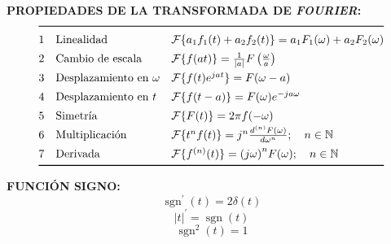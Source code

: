 \documentclass[letter,twoside,8pt]{article}
\DeclareMathOperator{\sgn}{sgn}
\begin{document}
\textbf{PROPIEDADES DE LA TRANSFORMADA DE \emph{FOURIER}:}
\begin{equation*}
\def\arraystretch{1.4}
\begin{array}{@{}cll@{}}
\toprule
 1 & \text{Linealidad}
   & \mathcal{F}\{a_1f_1(t)+a_2f_2(t)\}=a_1F_1(\omega)+a_2F_2(\omega)\\
 2 & \text{Cambio de escala}
   & \mathcal{F}\{f(at)\}=\frac{1}{|a|}F\left(\frac{\omega}{a}\right)\\
 3 & \text{Desplazamiento en }\omega
   & \mathcal{F}\{f(t)e^{jat}\}=F(\omega-a)\\
 4 & \text{Desplazamiento en }t
   & \mathcal{F}\{f(t-a)\}=F(\omega)e^{-ja\omega}\\
 5 & \text{Simetría}
   & \mathcal{F}\{F(t)\}=2{\pi}f(-\omega)\\
 6 & \text{Multiplicación}
   & \mathcal{F}\{t^{n}f(t)\}=j^n\frac{d^{(n)}F(\omega)}{d\omega^n};\quad{n}\in\mathbb{N}\\
 7 & \text{Derivada}
   & \mathcal{F}\{f^{(n)}(t)\}={(j\omega)}^{n}F(\omega);\quad{n}\in\mathbb{N}\\
\bottomrule
\end{array}
\end{equation*}

\textbf{FUNCIÓN SIGNO:}
\begin{equation*}
    \sgn^{\prime}(t)=2\delta(t)
\end{equation*}
\begin{equation*}
    |t|^{\prime}=\sgn(t)
\end{equation*}
\begin{equation*}
    \sgn^2(t)=1
\end{equation*}
\end{document}
